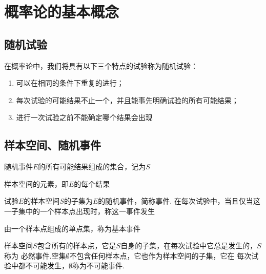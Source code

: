 \chapter{概率论的基本概念}

\section{随机试验}

\begin{definition}[随机试验]
  在概率论中，我们将具有以下三个特点的试验称为随机试验：
  \begin{enumerate}
    \item 可以在相同的条件下重复的进行；
    \item 每次试验的可能结果不止一个，并且能事先明确试验的所有可能结果；
    \item 进行一次试验之前不能确定哪个结果会出现
  \end{enumerate}
\end{definition}

\section{样本空间、随机事件}

\begin{definition}[样本空间]
  随机事件$E$的所有可能结果组成的集合，记为$S$
\end{definition}

\begin{definition}[样本点]
  样本空间的元素，即$E$的每个结果
\end{definition}

\begin{definition}[随机事件]
  试验$E$的样本空间$S$的子集为$E$的随机事件，简称{\heiti 事件}.
  在每次试验中，当且仅当这一子集中的一个样本点出现时，称这一{\heiti 事件发生}
\end{definition}

\begin{definition}[基本事件]
  由一个样本点组成的单点集，称为基本事件
\end{definition}

\begin{definition}[必然事件和不可能事件]
  样本空间$S$包含所有的样本点，它是$S$自身的子集，在每次试验中它总是发生的，$S$称为
  {\heiti 必然事件}.空集$\emptyset$不包含任何样本点，它也作为样本空间的子集，它在
  每次试验中都不可能发生，$\emptyset$称为{\heiti 不可能事件}.
\end{definition}

